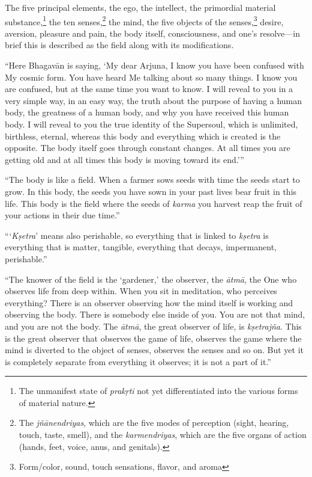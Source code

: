 {The five principal elements, the ego, the intellect, the primordial material substance,\footnote{The unmanifest state of \textit{prakṛti} not yet differentiated into the various forms of material nature.} the ten senses,\footnote{The \textit{jñānendriyas}, which are the five modes of perception (sight, hearing, touch, taste, smell), and the \textit{karmendriyas}, which are the five organs of action (hands, feet, voice, anus, and genitals).} the mind, the five objects of the senses,\footnote{Form/color, sound, touch sensations, flavor, and aroma} desire, aversion, pleasure and pain, the body itself, consciousness, and one’s resolve---in brief this is described as the field along with its modifications.}

\enquote{Here Bhagavān is saying, \enquote{My dear Arjuna, I know you have been confused with My cosmic form. You have heard Me talking about so many things. I know you are confused, but at the same time you want to know. I will reveal to you in a very simple way, in an easy way, the truth about the purpose of having a human body, the greatness of a human body, and why you have received this human body. I will reveal to you the true identity of the Supersoul, which is unlimited, birthless, eternal, whereas this body and everything which is created is the opposite. The body itself goes through constant changes. At all times you are getting old and at all times this body is moving toward its end.}}

\enquote{The body is like a field. When a farmer sows seeds with time the seeds start to grow. In this body, the seeds you have sown in your past lives bear fruit in this life. This body is the field where the seeds of \textit{karma} you harvest reap the fruit of your actions in their due time.}

\enquote{\enquote{\textit{Kṣetra}} means also perishable, so everything that is linked to \textit{kṣetra} is everything that is matter, tangible, everything that decays, impermanent, perishable.}

\enquote{The knower of the field is the \enquote{gardener,} the observer, the \textit{ātmā}, the One who observes life from deep within. When you sit in meditation, who perceives everything? There is an observer observing how the mind itself is working and observing the body. There is somebody else inside of you. You are not that mind, and you are not the body. The \textit{ātmā}, the great observer of life, is \textit{kṣetrajña}. This is the great observer that observes the game of life, observes the game where the mind is diverted to the object of senses, observes the senses and so on. But yet it is completely separate from everything it observes; it is not a part of it.}

